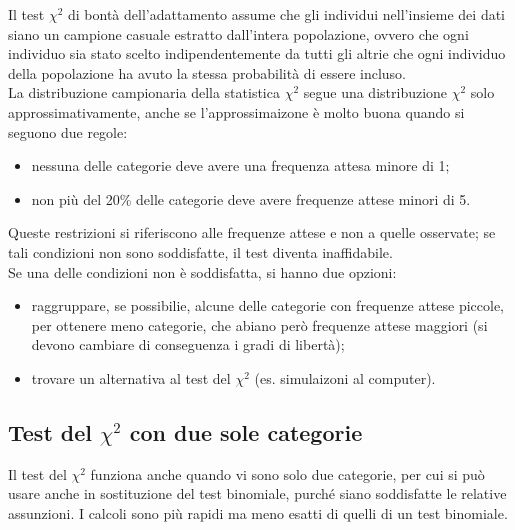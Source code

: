 \documentclass[10pt, draft]{book}
\newcommand{\tightlist}{%
\setlength{\itemsep}{1pt}\setlength{\parskip}{0pt}\setlength{\parsep}{0pt}}
\begin{document}
Il test $\chi^2$ di bontà dell'adattamento assume che gli individui nell'insieme dei dati siano un campione casuale estratto dall'intera popolazione, ovvero che ogni individuo sia stato scelto indipendentemente da tutti gli altrie che ogni individuo della popolazione ha avuto la stessa probabilità di essere incluso.
\\
La distribuzione campionaria della statistica $\chi^2$ segue una distribuzione $\chi^2$ solo approssimativamente, anche se l'approssimaizone è molto buona quando si seguono due regole:
\begin{itemize} \tightlist
    \item nessuna delle categorie deve avere una frequenza attesa minore di 1;
    \item non più del 20\% delle categorie deve avere frequenze attese minori di 5.
\end{itemize}
Queste restrizioni si riferiscono alle frequenze attese e non a quelle osservate; se tali condizioni non sono soddisfatte, il test diventa inaffidabile.
\\
Se una delle condizioni non è soddisfatta, si hanno due opzioni:
\begin{itemize} \tightlist
    \item raggruppare, se possibilie, alcune delle categorie con frequenze attese piccole, per ottenere meno categorie, che abiano però frequenze attese maggiori (si devono cambiare di conseguenza i gradi di libertà);
    \item trovare un alternativa al test del $\chi^2$ (es. simulaizoni al computer).
\end{itemize}

\subsection{Test del \texorpdfstring{$\chi^2$}{Lg} con due sole categorie}

Il test del $\chi^2$ funziona anche quando vi sono solo due categorie, per cui si può usare anche in sostituzione del test binomiale, purché siano soddisfatte le relative assunzioni. I calcoli sono più rapidi ma meno esatti di quelli di un test binomiale.
\end{document}
